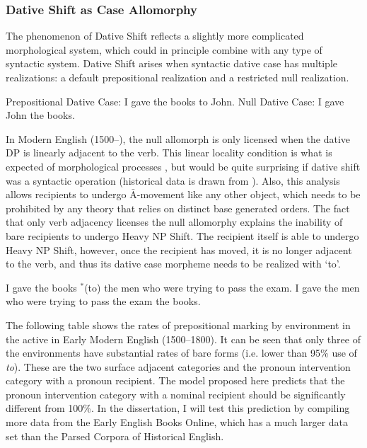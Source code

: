 \subsubsection{Dative Shift as Case Allomorphy}\label{sec:CaseAllo}
The phenomenon of Dative Shift reflects a slightly more complicated morphological system, which could in principle combine with any type of syntactic system. Dative Shift arises when syntactic dative case has multiple realizations: a default prepositional realization and a restricted null realization.

\begin{exe}
\ex Prepositional Dative Case: I gave the books to John.
\ex Null Dative Case: I gave John the books.
\end{exe}

In Modern English (1500--), the null allomorph is only licensed when the dative DP is linearly adjacent to the verb. This linear locality condition is what is expected of morphological processes \citep{Embick.2007,Embick.2010}, but would be quite surprising if dative shift was a syntactic operation (historical data is drawn from \cite{Kroch.2000,Kroch.2004,Taylor.2006,Kroch.2010}). Also, this analysis allows recipients to undergo $\bar{\text{A}}$-movement like any other object, which needs to be prohibited by any theory that relies on distinct base generated orders. The fact that only verb adjacency licenses the null allomorphy explains the inability of bare recipients to undergo Heavy NP Shift. The recipient itself is able to undergo Heavy NP Shift, however, once the recipient has moved, it is no longer adjacent to the verb, and thus its dative case morpheme needs to be realized with `to'.

\begin{exe}
\ex
\begin{xlist}
\ex I gave the books $^{\text{*}}$(to) the men who were trying to pass the exam.
\ex I gave the men who were trying to pass the exam the books.
\end{xlist}
\end{exe}




The following table shows the rates of prepositional marking by environment in the active in Early Modern English (1500--1800). It can be seen that only three of the environments have substantial rates of bare forms (i.e. lower than 95\% use of \emph{to}). These are the two surface adjacent categories and the pronoun intervention category with a pronoun recipient. The model proposed here predicts that the pronoun intervention category with a nominal recipient should be significantly different from 100\%.  In the dissertation, I will test this prediction by compiling more data from the Early English Books Online, which has a much larger data set than the Parsed Corpora of Historical English.

